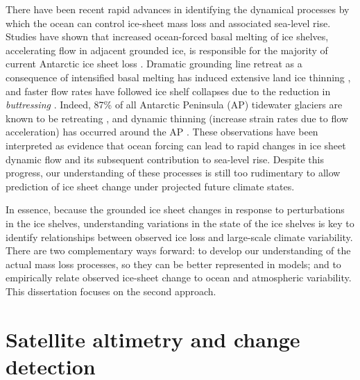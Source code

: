 There have been recent rapid advances in identifying the dynamical processes by which the
ocean can control ice-sheet mass loss and associated sea-level rise. Studies have shown that
increased ocean-forced basal melting of ice shelves, accelerating flow in adjacent grounded ice,
is responsible for the majority of current Antarctic ice sheet loss \parencite{Rignot2008,
Pritchard2009}. Dramatic grounding line retreat as a consequence
of intensified basal melting has induced extensive land ice thinning \parencite{Wingham2009,
Pritchard2009, Rignot2014}, and faster flow rates have followed ice shelf collapses
due to the reduction in \emph{buttressing} \parencite{Rignot2004, Rignot2005, Scambos2004}.
Indeed, 87\% of all Antarctic Peninsula (AP) tidewater glaciers are known to be retreating
\parencite{Cook2005}, and dynamic thinning (increase strain rates due to flow acceleration)
has occurred around the AP \parencite{Rignot2008, Pritchard2009}.
These observations have been interpreted as evidence that
ocean forcing can lead to rapid changes in ice sheet dynamic flow and its subsequent
contribution to sea-level rise. Despite this progress, our understanding of these processes
is still too rudimentary to allow prediction of ice sheet change under projected
future climate states.

In essence, because the grounded ice sheet changes in response to perturbations in the ice
shelves, understanding variations in the state of the ice shelves is key to
identify relationships between observed ice loss and large-scale climate variability.
There are two complementary ways forward: to develop our understanding of the actual mass
loss processes, so they can be better represented in models; and to empirically relate observed
ice-sheet change to ocean and atmospheric variability. This dissertation focuses on the second
approach.

\section*{Satellite altimetry and change detection}

